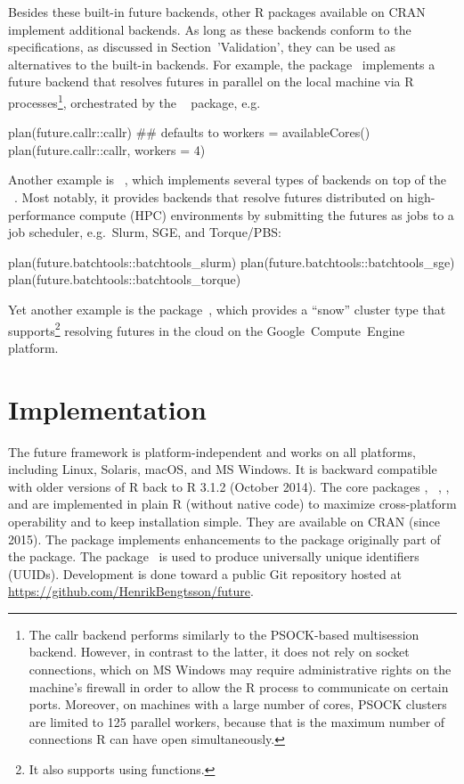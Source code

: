 Besides these built-in future backends, other R packages available on
CRAN implement additional backends.  As long as these backends conform
to the  specifications, as discussed in
Section~'Validation', they can be used as alternatives to the built-in
backends.
%
For example, the 
package~\citep{CRAN:future.callr} implements a future backend that
resolves futures in parallel on the local machine via R
processes\footnote{The callr backend performs similarly to the
PSOCK-based multisession backend. However, in contrast to the latter,
it does not rely on socket connections, which on MS Windows may
require administrative rights on the machine's firewall in order to
allow the R process to communicate on certain ports. Moreover, on
machines with a large number of cores, PSOCK clusters are limited to
125 parallel workers, because that is the maximum number of
connections R can have open simultaneously.}, orchestrated by
the ~\citep{CRAN:callr} package, e.g.
\begin{example}
plan(future.callr::callr)  ## defaults to workers = availableCores()
plan(future.callr::callr, workers = 4)
\end{example}
Another example
is ~\citep{CRAN:future.batchtools}, which
implements several types of backends on top of the
~\citep{Lang_etal_2017}.  Most notably, it provides
backends that resolve futures distributed on high-performance compute
(HPC) environments by submitting the futures as jobs to a job
scheduler, e.g.\ Slurm, SGE, and Torque/PBS:
\begin{example}
plan(future.batchtools::batchtools_slurm)
plan(future.batchtools::batchtools_sge)
plan(future.batchtools::batchtools_torque)
\end{example}
%
Yet another example is the 
package~\citep{CRAN:googleComputeEngineR}, which provides a ``snow''
cluster type that supports\footnote{It also supports
using  functions.}  resolving futures in the cloud
on the Google~Compute~Engine platform.


\section{Implementation}

The future framework is platform-independent and works on all
platforms, including Linux, Solaris, macOS, and MS Windows.  It is
backward compatible with older versions of R back to R 3.1.2 (October
2014).  The core packages ,
~\citep{CRAN:parallelly}, , and
 are implemented in plain R (without native code) to
maximize cross-platform operability and to keep installation simple.
They are available on CRAN (since 2015).  The  package
implements enhancements to the  package originally part
of the  package.  The 
package~\citep{CRAN:digest} is used to produce universally unique
identifiers (UUIDs).  Development is done toward a public Git
repository hosted at \url{https://github.com/HenrikBengtsson/future}.

